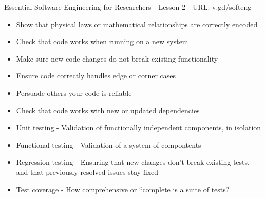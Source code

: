 \documentclass[8pt]{extarticle}
\begin{document}
\thispagestyle{empty}

\begin{center}
  {\LARGE
  Essential Software Engineering for Researchers - Lesson 2 - URL: v.gd/softeng}
\end{center}

\begin{navybox}[title=Why test?]
  \begin{multicols}{2}
    \begin{itemize}
    \itemsep-3pt
    \item Show that physical laws or mathematical relationships are correctly encoded
    \item Check that code works when running on a new system
    \item Make sure new code changes do not break existing functionality
    \item Ensure code correctly handles edge or corner cases
    \item Persuade others your code is reliable
    \item Check that code works with new or updated dependencies
    \end{itemize}
  \end{multicols}
\end{navybox}


\begin{bluebox}[title=Useful terms]
  \begin{itemize}
    \itemsep-3pt
  \item Unit testing - Validation of functionally independent components, in
    isolation
  \item Functional testing - Validation of a system of compontents
  \item Regression testing - Ensuring that new changes don't break existing
    tests, and that previously resolved issues stay fixed
  \item Test coverage - How comprehensive or ``complete is a suite of tests?
  \end{itemize}
\end{bluebox}
\end{document}
